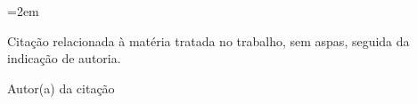 
\clearpage
\thispagestyle{empty}

\vspace*{16cm}

\noindent\hfill
\begin{minipage}{\dimexpr\textwidth-4cm\relax}
    \setlength{\parindent}{0pt}
    \justifying
    \emergencystretch=2em

    \noindent
    Citação relacionada à matéria tratada no trabalho,
    sem aspas, seguida da indicação de autoria.
    \par

    \vspace{0.5cm}
    \raggedleft
    Autor(a) da citação
    \par
\end{minipage}

\clearpage
